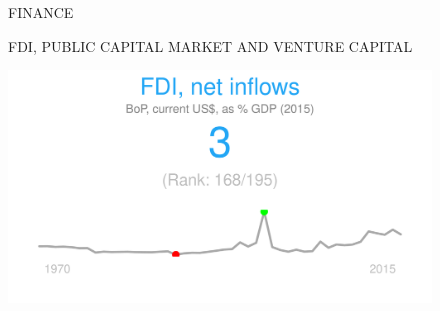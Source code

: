 \documentclass{article}\usepackage[]{graphicx}\usepackage[]{color}
\makeatletter
\def\maxwidth{ %
  \ifdim\Gin@nat@width>\linewidth
    \linewidth
  \else
    \Gin@nat@width
  \fi
}
\makeatother
\begin{document}
\begin{figure}
\vspace*{-27.5cm}
\hspace*{+1cm}
\begin{minipage}[c]{0.95\textwidth}
  \begin{minipage}[c]{0.95\textwidth}
    \begin{flushleft}  
     \Large{\textcolor[HTML]{22A6F5}{FINANCE}}
    \end{flushleft} 
     \small{\textcolor[HTML]{818181}{FDI, PUBLIC CAPITAL MARKET AND VENTURE CAPITAL}}
      \\[4pt]
      \begin{minipage}[c]{0.32\textwidth}  


{\centering \includegraphics[width=\maxwidth]{figure/figure_sparkline_Fin1-1} 

}



      \end{minipage}
      \begin{minipage}[c]{0.32\textwidth}



\end{minipage}
\end{minipage}
\end{minipage}
\end{figure}
\end{document}
